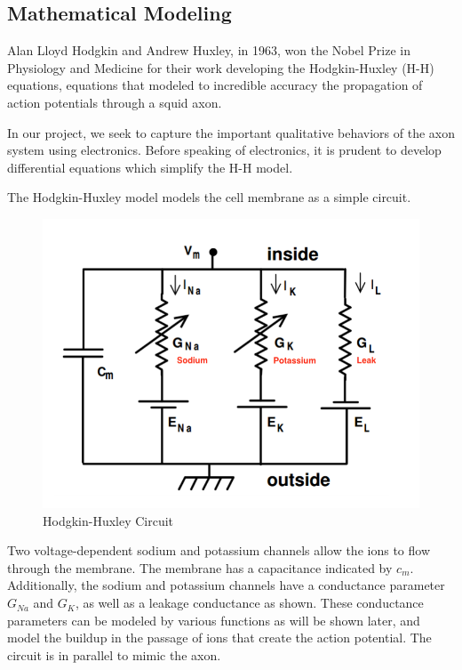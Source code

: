 \documentclass[12]{book}
\newcommand\0{\mathbf{0}}
\newcommand\<{\langle}
\renewcommand\>{\rangle}
\begin{document}
\subsection{Mathematical Modeling}

Alan Lloyd Hodgkin and Andrew Huxley, in 1963, won the Nobel Prize in Physiology and Medicine for their work developing the Hodgkin-Huxley (H-H) equations, equations that modeled to incredible accuracy the propagation of action potentials through a squid axon. 

In our project, we seek to capture the important qualitative behaviors of the axon system using electronics. Before speaking of electronics, it is prudent to develop differential equations which simplify the H-H model.

The Hodgkin-Huxley model models the cell membrane as a simple circuit. 

\begin{figure}[h]
    \centering
    \includegraphics[scale=0.5]{hhmodel}
    \caption{Hodgkin-Huxley Circuit}
    \label{fig:my_label}
\end{figure}

Two voltage-dependent sodium and potassium channels allow the ions to flow through the membrane. The membrane has a capacitance indicated by $c_m$. Additionally, the sodium and potassium channels have a conductance parameter $G_{Na}$ and $G_K$, as well as a leakage conductance as shown. These conductance parameters can be modeled by various functions as will be shown later, and model the buildup in the passage of ions that create the action potential. The circuit is in parallel to mimic the axon. 
\end{document}
